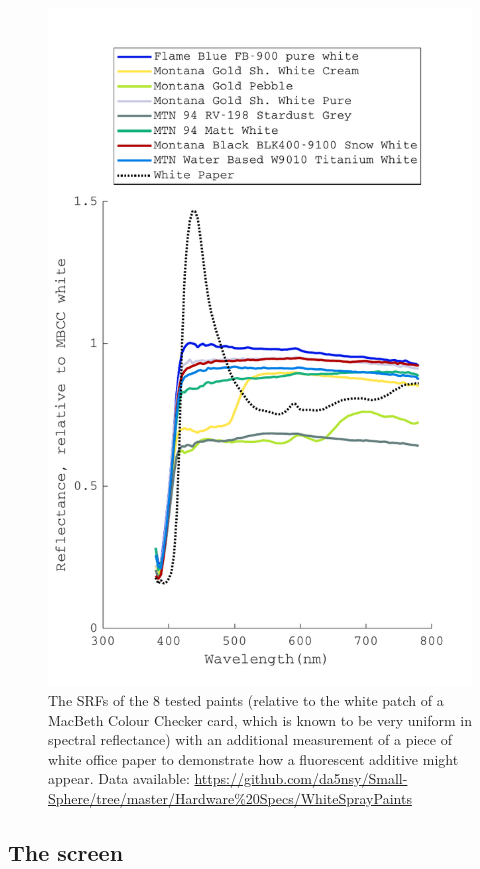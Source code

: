 \begin{figure}[htbp]
\includegraphics[max width=1.2\textwidth,center]{figs/SmallSphere/VisualiseSPDs_result.pdf}
\caption{The \glspl{SRF} of the 8 tested paints (relative to the white patch of a MacBeth Colour Checker card, which is known to be very uniform in spectral reflectance) with an additional measurement of a piece of white office paper to demonstrate how a fluorescent additive might appear. Data available: \url{https://github.com/da5nsy/Small-Sphere/tree/master/Hardware\%20Specs/WhiteSprayPaints}}
\label{fig:spray}
\end{figure}


\subsection{The screen}

